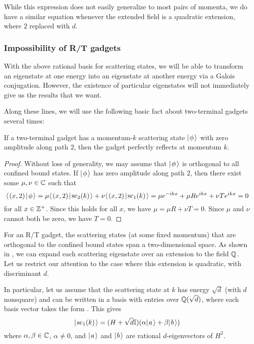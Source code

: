 \documentclass[../thesis-main/thesis-main]{subfiles}
\begin{document}
While this expression does not easily generalize to most pairs of momenta, we do have a similar equation whenever the extended field is a quadratic extension, where $2$ replaced with $d$.


\subsubsection{Impossibility of R/T gadgets}

With the above rational basis for scattering states, we will be able to transform an eigenstate at one energy into an eigenstate at another energy via a Galois conjugation.  However, the existence of particular eigenstates will not immediately give us the results that we want. 

Along these lines, we will use the following basic fact about two-terminal gadgets several times: 
\begin{fact}\label{fct:zero_ampl}
If a two-terminal gadget has a momentum-$k$ scattering state $|\mspace{2mu} \phi \mspace{2mu} \rangle$ with zero amplitude along path $2$, then the gadget perfectly reflects at momentum $k$.
\end{fact}
\begin{proof}
Without loss of generality, we may assume that $|\mspace{2mu} \phi \mspace{2mu} \rangle$ is orthogonal to all confined bound states.
If $|\mspace{2mu} \phi \mspace{2mu} \rangle$ has zero amplitude along path $2$, then there exist some $\mu,\nu \in \mathbb{C}$ such that
\begin{equation}
  \langle\mspace{2mu} (x,2) \mspace{2mu} | \mspace{2mu} \phi\mspace{2mu} \rangle
  = \mu \langle\mspace{2mu} (x,2) \mspace{2mu} | \mspace{2mu} \text{sc}_2 (k)\mspace{2mu} \rangle + \nu \langle\mspace{2mu} (x,2) \mspace{2mu} | \mspace{2mu} \text{sc}_1(k)\mspace{2mu} \rangle
  = \mu e^{-ikx} + \mu R e^{ikx} + \nu T e^{ikx}
  = 0
\end{equation} 
for all $x\in \mathbb{Z}^{+}$.  Since this holds for all $x$, we have $\mu = \mu R + \nu T = 0$.  Since $\mu$ and $\nu$ cannot both be zero, we have $T=0$.
\end{proof}

For an R/T gadget, the scattering states (at some fixed momentum) that are orthogonal to the confined bound states span a two-dimensional space. As shown in , we can expand each scattering eigenstate over an extension to the field $\mathbb{Q}$.  Let us restrict our attention to the case where this extension is quadratic, with discriminant $d$.

In particular, let us assume that the scattering state at $k$ has energy $\sqrt{d}$ (with $d$ nonsquare) and can be written in a basis with entries over $\mathbb{Q}(\sqrt{d})$, where each basis vector takes the form . This gives
\begin{equation*}
  |\mspace{2mu} \text{sc}_{1}(k) \mspace{2mu} \rangle 
  = (H + \sqrt{d}\mathbb{I}) (\alpha |\mspace{2mu} a \mspace{2mu} \rangle + \beta |\mspace{2mu} b \mspace{2mu} \rangle) \label{eq:rat_expansion}
\end{equation*}
where $\alpha,\beta \in \mathbb{C}$, $\alpha\neq 0$, and $|\mspace{2mu} a \mspace{2mu} \rangle$ and $|\mspace{2mu} b \mspace{2mu} \rangle$ are rational $d$-eigenvectors of $H^2$.
\end{document}
